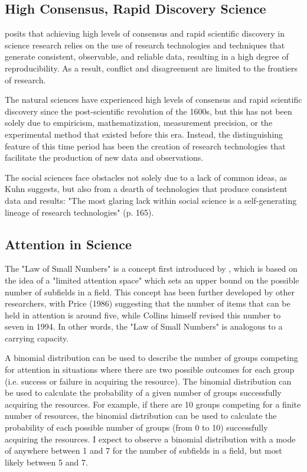\subsection{High Consensus, Rapid Discovery Science}

\cite{collins1994} posits that achieving high levels of consensus and rapid scientific discovery in science research relies on the use of research technologies and techniques that generate consistent, observable, and reliable data, resulting in a high degree of reproducibility. As a result, conflict and disagreement are limited to the frontiers of research. 

The natural sciences have experienced high levels of consensus and rapid scientific discovery since the post-scientific revolution of the 1600s, but this has not been solely due to empiricism, mathematization, measurement precision, or the experimental method that existed before this era. Instead, the distinguishing feature of this time period has been the creation of research technologies that facilitate the production of new data and observations.

The social sciences face obstacles not solely due to a lack of common ideas, as Kuhn suggests, but also from a dearth of technologies that produce consistent data and results: "The most glaring lack within social science is a self-generating lineage of research technologies" (p. 165).

\subsection{Attention in Science}

The "Law of Small Numbers" is a concept first introduced by \cite{collins1998}, which is based on the idea of a "limited attention space" which sets an upper bound on the possible number of subfields in a field. This concept has been further developed by other researchers, with Price (1986) suggesting that the number of items that can be held in attention is around five, while Collins himself revised this number to seven in 1994. In other words, the "Law of Small Numbers" is analogous to a carrying capacity.

A binomial distribution can be used to describe the number of groups competing for attention in situations where there are two possible outcomes for each group (i.e. success or failure in acquiring the resource). The binomial distribution can be used to calculate the probability of a given number of groups successfully acquiring the resources. For example, if there are 10 groups competing for a finite number of resources, the binomial distribution can be used to calculate the probability of each possible number of groups (from 0 to 10) successfully acquiring the resources. I expect to observe a binomial distribution with a mode of anywhere between 1 and 7 for the number of subfields in a field, but most likely between 5 and 7.

